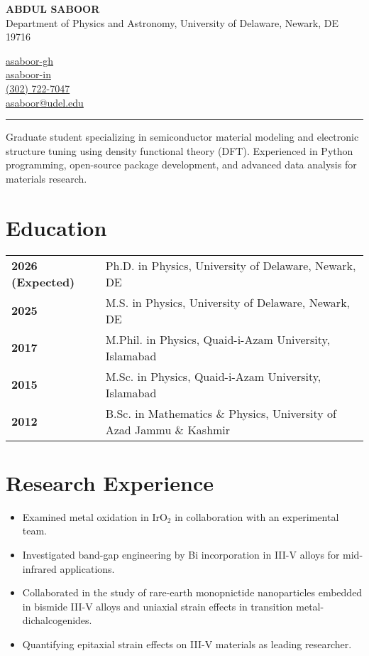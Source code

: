 \documentclass[letter,11pt]{article}
\begin{document}
\begin{minipage}{0.65\textwidth}
    \raggedright
    {\Large \textbf{ABDUL SABOOR}} \\ 
    Department of Physics and Astronomy, University of Delaware, Newark, DE 19716 
\end{minipage}
\hfill
\begin{minipage}{0.3\textwidth}
    \raggedright
    \faGithub \quad \href{https://github.com/asaboor-gh}{asaboor-gh}\\
    \faLinkedin \quad \href{https://linkedin.com/in/asaboor-in}{asaboor-in} \\
    \faPhone \quad \href{tel:+13027227047}{(302) 722-7047} \\
    \faEnvelope \quad \href{mailto:asaboor@udel.edu}{asaboor@udel.edu}
\end{minipage}
\vspace{2mm}
\hrule

\vspace{5mm} \noindent Graduate student specializing in semiconductor material modeling and electronic structure tuning using density functional theory (DFT). Experienced in Python programming, open-source package development, and advanced data analysis for materials research.

\section{Education}
\begin{tabular}{p{3.25cm} p{12cm}}
    \textbf{2026 (Expected)} & Ph.D. in Physics, University of Delaware, Newark, DE \\
    \textbf{2025} & M.S. in Physics, University of Delaware, Newark, DE \\
    \textbf{2017} & M.Phil. in Physics, Quaid-i-Azam University, Islamabad \\
    \textbf{2015} & M.Sc. in Physics, Quaid-i-Azam University, Islamabad \\
    \textbf{2012} & B.Sc. in Mathematics \& Physics, University of Azad Jammu \& Kashmir \\
\end{tabular}

\section{Research Experience}
\begin{itemize}
    \item Examined metal oxidation in IrO$_2$ in collaboration with an experimental team.
    \item Investigated band-gap engineering by Bi incorporation in III-V alloys for mid-infrared applications.
    \item Collaborated in the study of rare-earth monopnictide nanoparticles embedded in bismide III-V alloys and uniaxial strain effects in transition metal-dichalcogenides.
    \item Quantifying epitaxial strain effects on III-V materials as leading researcher.
\end{itemize}
\end{document}
